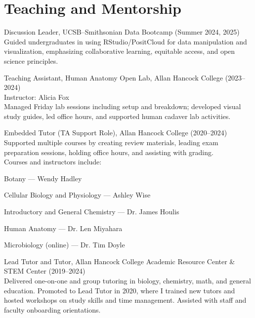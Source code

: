 \documentclass[letterpaper]{article}
\renewenvironment{itemize}{
  \begin{list}{}{
    \setlength{\leftmargin}{1.5em}
  }
}{
  \end{list}
}
\newenvironment{biblist}{%
   \begin{list}{}{%
     \setlength{\labelwidth}{0pt}%
     \setlength{\labelsep}{1em}%
     \setlength{\leftmargin}{2em}%
     \setlength{\itemindent}{-1em}%
   }
}{\end{list}}
\begin{document}
\section*{Teaching and Mentorship}

\begin{biblist}

\item Discussion Leader, UCSB–Smithsonian Data Bootcamp (Summer 2024, 2025)\\
Guided undergraduates in using RStudio/PositCloud for data manipulation and visualization, emphasizing collaborative learning, equitable access, and open science principles.

\item Teaching Assistant, Human Anatomy Open Lab, Allan Hancock College (2023–2024)\\
Instructor: Alicia Fox\\
Managed Friday lab sessions including setup and breakdown; developed visual study guides, led office hours, and supported human cadaver lab activities.

\item Embedded Tutor (TA Support Role), Allan Hancock College (2020–2024)\\
Supported multiple courses by creating review materials, leading exam preparation sessions, holding office hours, and assisting with grading.\\
Courses and instructors include: 
\begin{itemize}
  \item Botany — Wendy Hadley
  \item Cellular Biology and Physiology — Ashley Wise
  \item Introductory and General Chemistry — Dr. James Houlis
  \item Human Anatomy — Dr. Len Miyahara
  \item Microbiology (online) — Dr. Tim Doyle
\end{itemize}

\item Lead Tutor and Tutor, Allan Hancock College Academic Resource Center \& STEM Center (2019–2024)\\
Delivered one-on-one and group tutoring in biology, chemistry, math, and general education. Promoted to Lead Tutor in 2020, where I trained new tutors and hosted workshops on study skills and time management. Assisted with staff and faculty onboarding orientations.

\end{biblist}
\end{document}
